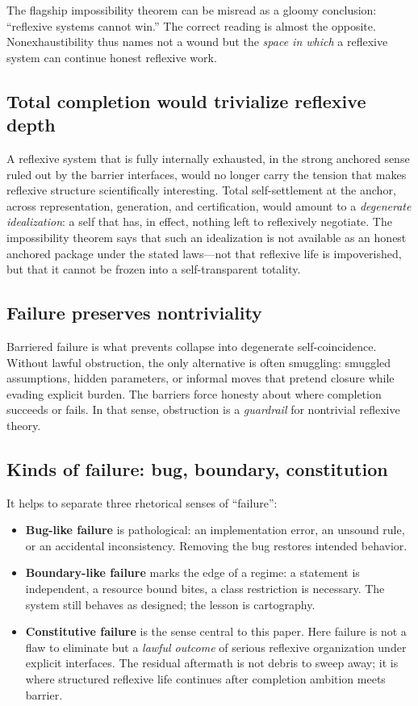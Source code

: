 \documentclass[11pt]{article}
\theoremstyle{plain}
\theoremstyle{definition}
\theoremstyle{remark}
\begin{document}
The flagship impossibility theorem can be misread as a gloomy conclusion: ``reflexive systems cannot win.'' The correct reading is almost the opposite.
Nonexhaustibility thus names not a wound but the \emph{space in which} a reflexive system can continue honest reflexive work.

\subsection{Total completion would trivialize reflexive depth}

A reflexive system that is fully internally exhausted, in the strong anchored sense ruled out by the barrier interfaces, would no longer carry the tension that makes reflexive structure scientifically interesting. Total self-settlement at the anchor, across representation, generation, and certification, would amount to a \emph{degenerate idealization}: a self that has, in effect, nothing left to reflexively negotiate. The impossibility theorem says that such an idealization is not available as an honest anchored package under the stated laws---not that reflexive life is impoverished, but that it cannot be frozen into a self-transparent totality.

\subsection{Failure preserves nontriviality}

Barriered failure is what prevents collapse into degenerate self-coincidence. Without lawful obstruction, the only alternative is often smuggling: smuggled assumptions, hidden parameters, or informal moves that pretend closure while evading explicit burden. The barriers force honesty about where completion succeeds or fails. In that sense, obstruction is a \emph{guardrail} for nontrivial reflexive theory.

\subsection{Kinds of failure: bug, boundary, constitution}

It helps to separate three rhetorical senses of ``failure'':
\begin{itemize}[leftmargin=1.5em]
\item \textbf{Bug-like failure} is pathological: an implementation error, an unsound rule, or an accidental inconsistency. Removing the bug restores intended behavior.
\item \textbf{Boundary-like failure} marks the edge of a regime: a statement is independent, a resource bound bites, a class restriction is necessary. The system still behaves as designed; the lesson is cartography.
\item \textbf{Constitutive failure} is the sense central to this paper. Here failure is not a flaw to eliminate but a \emph{lawful outcome} of serious reflexive organization under explicit interfaces. The residual aftermath is not debris to sweep away; it is where structured reflexive life continues after completion ambition meets barrier.
\end{itemize}
\end{document}
